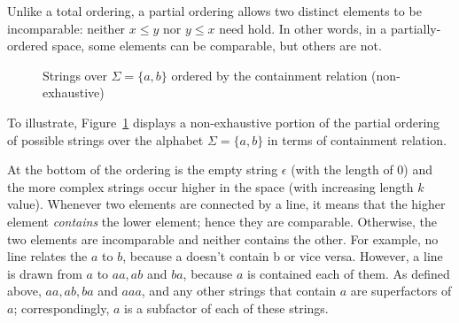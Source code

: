 Unlike a total ordering, a partial ordering
allows two distinct elements to be incomparable: neither
$x \leq y$ nor $y \leq x$ need hold. In other words, in a partially-ordered space, some elements can be comparable, but others are not.

\begin{figure}
	\centering
	\caption{Strings over $\Sigma = \{a,b\}$ ordered by the containment relation (non-exhaustive)}
	\label{fig:hasse.str}
\end{figure}%


To illustrate, Figure~\ref{fig:hasse.str} displays a
non-exhaustive portion of the partial ordering of possible strings
over the alphabet $\Sigma = \{a,b\}$ in terms of containment relation. 

At the bottom of the ordering is
the empty string $\epsilon$ (with the length of \(0\)) and the more complex strings occur
higher in the space (with increasing length \(k\) value). Whenever two elements are connected by a
line, it means that the higher element \textit{contains} the lower element;
hence they are comparable.
Otherwise, the two elements are incomparable and neither contains the other.
For example, no line relates the \(a\) to \(b\), because a doesn't contain b or vice versa. However, a line is drawn from \(a\) to \(aa, ab\) and
\(ba\), because \(a\) is contained each of them. As
defined above, \(aa, ab, ba\) and \(aaa\), and any other strings that
contain \(a\) are superfactors of \(a\); correspondingly, \(a\) is a
subfactor of each of these strings.

